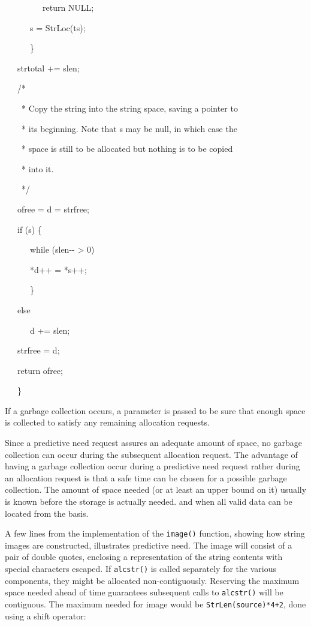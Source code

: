 {\ttfamily\mdseries
\ \ \ \ \ \ \ \ \ return NULL;
}

{\ttfamily\mdseries
\ \ \ \ \ \ s = StrLoc(ts);
}

{\ttfamily\mdseries
\ \ \ \ \ \ \}
}


\bigskip

{\ttfamily\mdseries
\ \ \ strtotal += slen;}

{\ttfamily\mdseries
\ \ \ /*}

{\ttfamily
\ \ \ \ * Copy the string into the string space, saving a pointer to}

{\ttfamily\mdseries
\ \ \ \ * its beginning. Note that s may be null, in which case the}

{\ttfamily\mdseries
\ \ \ \ * space is still to be allocated but nothing is to be copied}

{\ttfamily\mdseries
\ \ \ \ * into it.}

{\ttfamily\mdseries
\ \ \ \ */}

{\ttfamily\mdseries
\ \ \ ofree = d = strfree;}

{\ttfamily\mdseries
\ \ \ if (s) \{}

{\ttfamily\mdseries
\ \ \ \ \ \ while (slen-{}- {\textgreater} 0)}

{\ttfamily\mdseries
\ \ \ \ \ \ *d++ = *s++;}

{\ttfamily\mdseries
\ \ \ \ \ \ \}}

{\ttfamily\mdseries
\ \ \ else}

{\ttfamily\mdseries
\ \ \ \ \ \ d += slen;}

{\ttfamily\mdseries
\ \ \ strfree = d;}

{\ttfamily\mdseries
\ \ \ return ofree;}

{\ttfamily\mdseries
\ \ \ \}}


If a garbage collection occurs, a parameter is passed to be sure that
enough space is collected to satisfy any remaining allocation
requests.

Since a predictive need request assures an adequate amount of space,
no garbage collection can occur during the subsequent allocation
request. The advantage of having a garbage collection occur during a
predictive need request rather during an allocation request is that a
safe time can be chosen for a possible garbage collection. The amount
of space needed (or at least an upper bound on it) usually is known
before the storage is actually needed. and when all valid data can be
located from the basis.

A few lines from the implementation of the \texttt{image()} function,
showing how string images are constructed, illustrates predictive
need. The image will consist of a pair of double quotes, enclosing a
representation of the string contents with special characters
escaped. If \texttt{alcstr()} is called separately for the various
components, they might be allocated non-contiguously. Reserving the
maximum space needed ahead of time guarantees subsequent calls to
\texttt{alcstr()} will be contiguous. The maximum needed for image
would be \texttt{StrLen(source)*4+2}, done using a shift operator:

